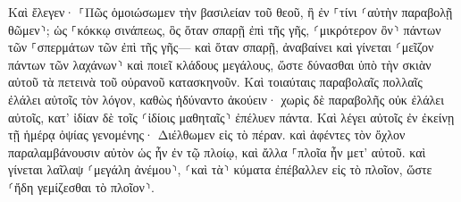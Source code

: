 \documentclass{openreader}
\begin{document}
Καὶ ἔλεγεν· ⸀Πῶς ὁμοιώσωμεν τὴν βασιλείαν τοῦ θεοῦ, ἢ ἐν ⸀τίνι ⸂αὐτὴν παραβολῇ θῶμεν⸃; 
ὡς ⸀κόκκῳ σινάπεως, ὃς ὅταν σπαρῇ ἐπὶ τῆς γῆς, ⸂μικρότερον ὂν⸃ πάντων τῶν ⸀σπερμάτων τῶν ἐπὶ τῆς γῆς— 
καὶ ὅταν σπαρῇ, ἀναβαίνει καὶ γίνεται ⸂μεῖζον πάντων τῶν λαχάνων⸃ καὶ ποιεῖ κλάδους μεγάλους, ὥστε δύνασθαι ὑπὸ τὴν σκιὰν αὐτοῦ τὰ πετεινὰ τοῦ οὐρανοῦ κατασκηνοῦν. 
Καὶ τοιαύταις παραβολαῖς πολλαῖς ἐλάλει αὐτοῖς τὸν λόγον, καθὼς ἠδύναντο ἀκούειν· 
χωρὶς δὲ παραβολῆς οὐκ ἐλάλει αὐτοῖς, κατ’ ἰδίαν δὲ τοῖς ⸂ἰδίοις μαθηταῖς⸃ ἐπέλυεν πάντα. 
Καὶ λέγει αὐτοῖς ἐν ἐκείνῃ τῇ ἡμέρᾳ ὀψίας γενομένης· Διέλθωμεν εἰς τὸ πέραν. 
καὶ ἀφέντες τὸν ὄχλον παραλαμβάνουσιν αὐτὸν ὡς ἦν ἐν τῷ πλοίῳ, καὶ ἄλλα ⸀πλοῖα ἦν μετ’ αὐτοῦ. 
καὶ γίνεται λαῖλαψ ⸂μεγάλη ἀνέμου⸃, ⸂καὶ τὰ⸃ κύματα ἐπέβαλλεν εἰς τὸ πλοῖον, ὥστε ⸂ἤδη γεμίζεσθαι τὸ πλοῖον⸃. 
\end{document}
